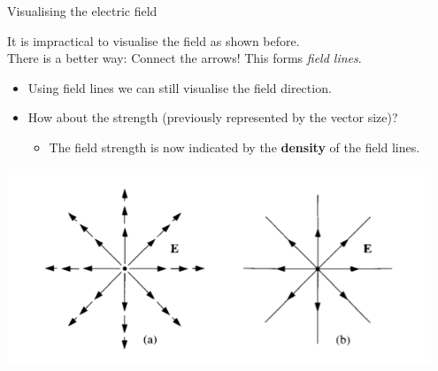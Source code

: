 %
%
%

\begin{frame}{Visualising the electric field}

It is impractical to visualise the field as shown before.\\
There is a better way: Connect the arrows! This forms {\em field lines}.\\

\begin{itemize}
\item
  Using field lines we can still visualise the field direction.
\item
  How about the strength (previously represented by the vector size)?
  \begin{itemize}
     \item The field strength is now indicated by the {\bf density} of the field lines.
  \end{itemize}
\end{itemize}

\includegraphics[width=0.95\textwidth]{./images/schematics/electric_field_and_field_lines_pos_point_charge.png}\\

\end{frame}


%
%
%

